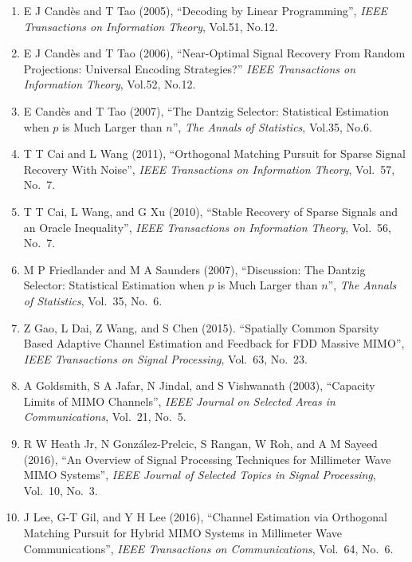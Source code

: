\begin{enumerate}
\item E J Cand\`es and T Tao (2005), ``Decoding by Linear Programming'', \textit{IEEE Transactions on Information Theory}, Vol.51, No.12.

\item E J Cand\`es and T Tao (2006), ``Near-Optimal Signal Recovery From Random Projections: Universal Encoding Strategies?'' \textit{IEEE Transactions on Information Theory}, Vol.52, No.12.

\item E Cand\`es and T Tao (2007), ``The Dantzig Selector: Statistical Estimation when \(p\) is Much Larger than \(n\)'', \textit{The Annals of Statistics}, Vol.35, No.6.

\item T T Cai and L Wang (2011), ``Orthogonal Matching Pursuit for Sparse Signal Recovery With Noise'', \textit{IEEE Transactions on Information Theory}, Vol.\ 57, No.\ 7.

\item T T Cai, L Wang, and G Xu (2010), ``Stable Recovery of Sparse Signals and an Oracle Inequality'', \textit{IEEE Transactions on Information Theory}, Vol.\ 56, No.\ 7.

\item M P Friedlander and M A Saunders (2007), ``Discussion: The Dantzig Selector: Statistical Estimation when \(p\) is Much Larger than \(n\)'', \textit{The Annals of Statistics}, Vol.\ 35, No.\ 6.

\item Z Gao, L Dai, Z Wang, and S Chen (2015). ``Spatially Common Sparsity Based Adaptive Channel Estimation and Feedback for FDD Massive MIMO'', \textit{IEEE Transactions on Signal Processing}, Vol.\ 63, No.\ 23.

\item A Goldsmith, S A Jafar, N Jindal, and S Vishwanath (2003), ``Capacity Limits of MIMO Channels'', \textit{IEEE Journal on Selected Areas in Communications}, Vol.\ 21, No.\ 5.

\item R W Heath Jr, N González-Prelcic, S Rangan, W Roh, and A M Sayeed (2016), ``An Overview of Signal Processing Techniques for Millimeter Wave MIMO Systems'', \textit{IEEE Journal of Selected Topics in Signal Processing}, Vol.\ 10, No.\ 3.

\item J Lee, G-T Gil, and Y H Lee (2016), ``Channel Estimation via Orthogonal Matching Pursuit for Hybrid MIMO Systems in Millimeter Wave Communications'', \textit{IEEE Transactions on Communications}, Vol.\ 64, No.\ 6.


\end{enumerate}
